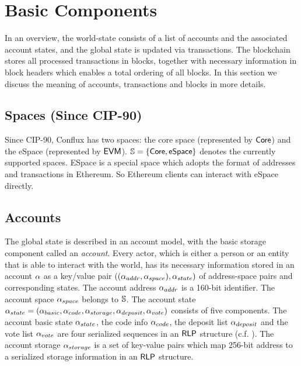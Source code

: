 

\section{Basic Components}
In an overview, the {\name} world-state consists of a list of accounts and the associated account states, and the global state is updated via transactions. 
The {\name} blockchain stores all processed transactions in blocks, together with necessary information in block headers which enables a total ordering of all blocks.
In this section we discuss the meaning of accounts, transactions and blocks in more details.

\subsection{Spaces (Since CIP-90)}\label{sec:spaces}

Since CIP-90, Conflux has two spaces: the core space (represented by ${\sf Core}$) and the eSpace (represented by ${\sf EVM}$). $\mathbb{S}=\{\mathsf{Core},\mathsf{eSpace}\}$ denotes the currently supported spaces.
%
ESpace is a special space which adopts the format of addresses and transactions in Ethereum. So Ethereum clients can interact with eSpace directly. 

\subsection{Accounts}
\label{subsec:accounts}

The {\name} global state is described in an account model, with the basic storage component called an \emph{account}.
Every actor, which is either a person or an entity that is able to interact with the {\name} world, has its necessary information stored in an account $\mathbf{\alpha}$ as a key/value pair $((\mathbf{\alpha}_{addr},\mathbf{\alpha}_{space}), \mathbf{\alpha}_{state})$ of address-space pairs and corresponding states. 
%
The account address $\mathbf{\alpha}_{addr}$ is a 160-bit identifier. The account space $\mathbf{\alpha}_{space}$ belongs to  $\mathbb{S}$. The account state $\mathbf{\alpha}_{state}= (\mathbf{\alpha}_{basic},\mathbf{\alpha}_{code}, \mathbf{\alpha}_{storage},\mathbf{\alpha}_{deposit},\mathbf{\alpha}_{vote})$ consists of five components. The account basic state $\mathbf{\alpha}_{state}$, the code info $\mathbf{\alpha}_{code}$, the deposit list $\mathbf{\alpha}_{deposit}$ and the vote list $\mathbf{\alpha}_{vote}$ are four serialized sequences in an $\mathsf{RLP}$ structure (c.f. \cite{ETH_yellow}). The account storage $\mathbf{\alpha}_{storage}$ is a set of key-value pairs which map 256-bit address to a serialized storage information in an $\mathsf{RLP}$ structure.

